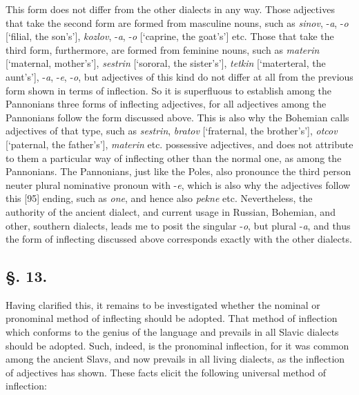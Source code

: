 This form does not differ from the other dialects in any way. Those adjectives that take the second form are formed from masculine nouns, such as \textit{sinov}, -\textit{a}, -\textit{o} [‘filial, the son’s’], \textit{kozlov}, -\textit{a}, -\textit{o} [‘caprine, the goat’s’] etc. Those that take the third form, furthermore, are formed from feminine nouns, such as \textit{materin} [‘maternal, mother’s’], \textit{sestrin} [‘sororal, the sister’s’], \textit{tetkin} [‘materteral, the aunt’s’], -\textit{a}, -\textit{e}, -\textit{o}, but adjectives of this kind do not differ at all from the previous form shown in terms of inflection. So it is superfluous to establish among the Pannonians three forms of inflecting adjectives, for all adjectives among the Pannonians follow the form discussed above. This is also why the Bohemian calls adjectives of that type, such as \textit{sestrin}, \textit{bratov} [‘fraternal, the brother’s’], \textit{otcov} [‘paternal, the father’s’], \textit{materin} etc. possessive adjectives, and does not attribute to them a particular way of inflecting other than the normal one, as among the Pannonians. The Pannonians, just like the Poles, also pronounce the third person neuter plural nominative pronoun with -\textit{e}, which is also why the adjectives follow this [95] ending, such as \textit{one}, and hence also \textit{pekne} etc. Nevertheless, the authority of the ancient dialect, and current usage in Russian, Bohemian, and other, southern dialects, leads me to posit the singular -\textit{o}, but plural -\textit{a}, and thus the form of inflecting discussed above corresponds exactly with the other dialects.

\subsection*{\hspace*{\fill}§. 13.\hspace*{\fill}}

Having clarified this, it remains to be investigated whether the nominal or pro\-nominal method of inflecting should be adopted. That method of inflection which conforms to the genius of the language and prevails in all Slavic dialects should be adopted. Such, indeed, is the pronominal inflection, for it was common among the ancient Slavs, and now prevails in all living dialects, as the inflection of adjectives has shown. These facts elicit the following universal method of inflection:

